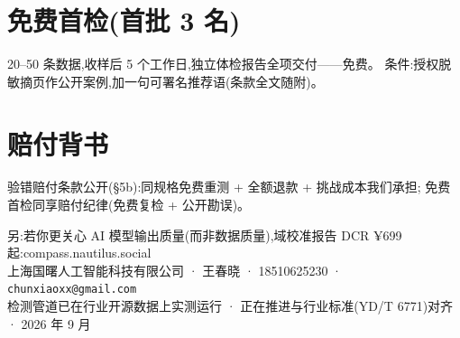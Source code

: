 \documentclass[10pt,a4paper]{ctexart}
\begin{document}
\section*{免费首检(首批 3 名)}
20–50 条数据,收样后 5 个工作日,独立体检报告全项交付——免费。
条件:授权脱敏摘页作公开案例,加一句可署名推荐语(条款全文随附)。

\section*{赔付背书}
验错赔付条款公开(§5b):同规格免费重测 + 全额退款 + 挑战成本我们承担;
免费首检同享赔付纪律(免费复检 + 公开勘误)。

\vspace{0.3em}
\begin{tcolorbox}[colback=gray!6,colframe=gray!40,boxrule=0.4pt,arc=2pt]
\small 另:若你更关心 AI 模型输出质量(而非数据质量),域校准报告 DCR
¥699 起:compass.nautilus.social\\[0.3em]
上海国曙人工智能科技有限公司 · 王春晓 · 18510625230 ·
\texttt{chunxiaoxx@gmail.com}\\
检测管道已在行业开源数据上实测运行 · 正在推进与行业标准(YD/T 6771)对齐
· 2026 年 9 月
\end{tcolorbox}
\end{document}
